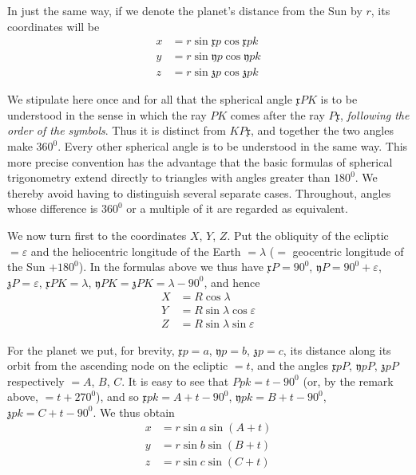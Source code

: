 In just the same way, if we denote the planet’s distance from the Sun by $r$,
its coordinates will be
\[
\begin{aligned}
x&=r\sin\mathfrak{x}p\cos\mathfrak{x}pk\\
y&=r\sin\mathfrak{y}p\cos\mathfrak{y}pk\\
z&=r\sin\mathfrak{z}p\cos\mathfrak{z}pk
\end{aligned}
\]

We stipulate here once and for all that the spherical angle $\mathfrak{x}PK$
is to be understood in the sense in which the ray $PK$ comes after the ray
$P\mathfrak{x}$, \textit{following the order of the symbols}. Thus it is distinct from
$KP\mathfrak{x}$, and together the two angles make $360^0$. Every other
spherical angle is to be understood in the same way. This more precise
convention has the advantage that the basic formulas of spherical trigonometry
extend directly to triangles with angles greater than $180^0$. We thereby avoid
having to distinguish several separate cases. Throughout, angles whose
difference is $360^0$ or a multiple of it are regarded as equivalent.

We now turn first to the coordinates $X$, $Y$, $Z$. Put the obliquity of the
ecliptic $=\varepsilon$ and the heliocentric longitude of the Earth $=\lambda$
($=$ geocentric longitude of the Sun $+180^0$). In the formulas above we thus have
$\mathfrak{x}P=90^0$, $\mathfrak{y}P=90^0+\varepsilon$, $\mathfrak{z}P=\varepsilon$,
$\mathfrak{x}PK=\lambda$, $\mathfrak{y}PK=\mathfrak{z}PK=\lambda-90^0$, and hence
%
\[
\begin{aligned}
X&=R\cos\lambda\\
Y&=R\sin\lambda\cos\varepsilon\\
Z&=R\sin\lambda\sin\varepsilon
\end{aligned}
\]

For the planet we put, for brevity, $\mathfrak{x}p=a$, $\mathfrak{y}p=b$,
$\mathfrak{z}p=c$, its distance along its orbit from the ascending node on the
ecliptic $=t$, and the angles $\mathfrak{x}pP$, $\mathfrak{y}pP$, $\mathfrak{z}pP$
respectively $=A$, $B$, $C$. It is easy to see that $Ppk=t-90^0$ (or, by the
remark above, $=t+270^0$), and so $\mathfrak{x}pk=A+t-90^0$,
$\mathfrak{y}pk=B+t-90^0$, $\mathfrak{z}pk=C+t-90^0$. We thus obtain
\[
\begin{aligned}
x&=r\sin a\sin(A+t)\\
y&=r\sin b\sin(B+t)\\
z&=r\sin c\sin(C+t)
\end{aligned}
\]

